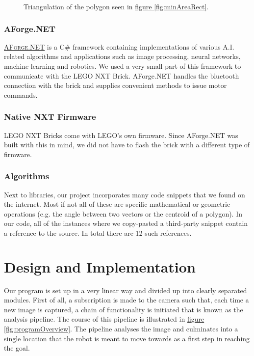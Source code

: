 \documentclass[10pt, abstracton]{scrartcl}
\newcommand{\fref}[1]{\hyperref[#1]{figure \vref{#1}}}
\newcommand{\link}[2]{\textsc{\href{#1}{#2}}}
\begin{document}
\begin{figure}
	\centering
	
	\caption{\small Triangulation of the polygon seen in \fref{fig:minAreaRect}.}
	\label{fig:triangulatuon}
\end{figure}

\subsubsection{AForge.NET}
\link{http://www.aforgenet.com}{AForge.NET} is a C\# framework containing implementations of various A.I. related algorithms and applications such as image processing, neural networks, machine learning and robotics. We used a very small part of this framework to communicate with the LEGO NXT Brick. AForge.NET handles the bluetooth connection with the brick and supplies convenient methods to issue motor commands.

\subsubsection{Native NXT Firmware}
LEGO NXT Bricks come with LEGO's own firmware. Since AForge.NET was built with this in mind, we did not have to flash the brick with a different type of firmware.

\subsubsection{Algorithms}
Next to libraries, our project incorporates many code snippets that we found on the internet. Most if not all of these are specific mathematical or geometric operations (e.g. the angle between two vectors or the centroid of a polygon). In our code, all of the instances where we copy-pasted a third-party snippet contain a reference to the source. In total there are 12 such references.

\section{Design and Implementation}
Our program is set up in a very linear way and divided up into clearly separated modules. First of all, a subscription is made to the camera such that, each time a new image is captured, a chain of functionality is initiated that is known as the analysis pipeline. The course of this pipeline is illustrated in \fref{fig:programOverview}. The pipeline analyses the image and culminates into a single location that the robot is meant to move towards as a first step in reaching the goal.
\end{document}
